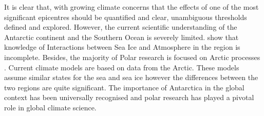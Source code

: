 It is clear that, with growing climate concerns that the effects of one of the most significant epicentres should be quantified and clear, unambiguous thresholds defined and explored. However, the current scientific understanding of the Antarctic continent and the Southern Ocean is severely limited\cite{kennicutt2016delivering}. \textcite{vichi2019effects} show that knowledge of Interactions between Sea Ice and Atmosphere in the region is incomplete. Besides, the majority of Polar research is focused on Arctic processes \cite{vichi2019effects}. Current climate models are based on data from the Arctic. These models assume similar states for the sea and sea ice however the differences between the two regions are quite significant. The importance of Antarctica in the global context has been universally recognised and polar research has played a pivotal role in global climate science.\par 

